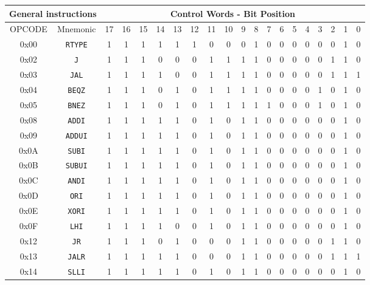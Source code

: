 \begin{table}[!htbp]
	\small
	\centering
		\begin{tabular}{|c|c|cccccccccccccccccc|}
		\hline
		  \multicolumn{2}{|c|}{\textbf{General instructions}} & \multicolumn{18}{c|}{\textbf{Control Words - Bit Position}} \\
		\hline
		OPCODE & Mnemonic & 17 & 16 & 15 & 14 & 13 & 12 & 11 & 10 & 9 & 8 & 7 & 6 & 5 & 4 & 3 & 2 & 1 & 0 \\
		\hline
		0x00 & \texttt{RTYPE} & 1 & 1 & 1 & 1 & 1 & 1 & 0 & 0 & 0 & 1 & 0 & 0 & 0 & 0 & 0 & 0 & 1 & 0 \\
		0x02 & \texttt{J} & 1 & 1 & 1 & 0 & 0 & 0 & 1 & 1 & 1 & 1 & 0 & 0 & 0 & 0 & 0 & 1 & 1 & 0 \\
		0x03 & \texttt{JAL} & 1 & 1 & 1 & 1 & 0 & 0 & 1 & 1 & 1 & 1 & 0 & 0 & 0 & 0 & 0 & 1 & 1 & 1 \\
		0x04 & \texttt{BEQZ} & 1 & 1 & 1 & 0 & 1 & 0 & 1 & 1 & 1 & 1 & 0 & 0 & 0 & 0 & 1 & 0 & 1 & 0 \\
		0x05 & \texttt{BNEZ} & 1 & 1 & 1 & 0 & 1 & 0 & 1 & 1 & 1 & 1 & 1 & 0 & 0 & 0 & 1 & 0 & 1 & 0 \\
		0x08 & \texttt{ADDI} & 1 & 1 & 1 & 1 & 1 & 0 & 1 & 0 & 1 & 1 & 0 & 0 & 0 & 0 & 0 & 0 & 1 & 0 \\
		0x09 & \texttt{ADDUI} & 1 & 1 & 1 & 1 & 1 & 0 & 1 & 0 & 1 & 1 & 0 & 0 & 0 & 0 & 0 & 0 & 1 & 0 \\
		0x0A & \texttt{SUBI} & 1 & 1 & 1 & 1 & 1 & 0 & 1 & 0 & 1 & 1 & 0 & 0 & 0 & 0 & 0 & 0 & 1 & 0 \\
		0x0B & \texttt{SUBUI} & 1 & 1 & 1 & 1 & 1 & 0 & 1 & 0 & 1 & 1 & 0 & 0 & 0 & 0 & 0 & 0 & 1 & 0 \\
		0x0C & \texttt{ANDI} & 1 & 1 & 1 & 1 & 1 & 0 & 1 & 0 & 1 & 1 & 0 & 0 & 0 & 0 & 0 & 0 & 1 & 0 \\
		0x0D & \texttt{ORI} & 1 & 1 & 1 & 1 & 1 & 0 & 1 & 0 & 1 & 1 & 0 & 0 & 0 & 0 & 0 & 0 & 1 & 0 \\
		0x0E & \texttt{XORI} & 1 & 1 & 1 & 1 & 1 & 0 & 1 & 0 & 1 & 1 & 0 & 0 & 0 & 0 & 0 & 0 & 1 & 0 \\
		0x0F & \texttt{LHI} & 1 & 1 & 1 & 1 & 0 & 0 & 1 & 0 & 1 & 1 & 0 & 0 & 0 & 0 & 0 & 0 & 1 & 0 \\
		0x12 & \texttt{JR} & 1 & 1 & 1 & 0 & 1 & 0 & 0 & 0 & 1 & 1 & 0 & 0 & 0 & 0 & 0 & 1 & 1 & 0 \\
		0x13 & \texttt{JALR} & 1 & 1 & 1 & 1 & 1 & 0 & 0 & 0 & 1 & 1 & 0 & 0 & 0 & 0 & 0 & 1 & 1 & 1 \\
		0x14 & \texttt{SLLI} & 1 & 1 & 1 & 1 & 1 & 0 & 1 & 0 & 1 & 1 & 0 & 0 & 0 & 0 & 0 & 0 & 1 & 0 \\

\end{tabular}
\end{table}

